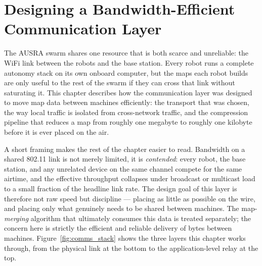 
\chapter{Designing a Bandwidth-Efficient Communication Layer}
\label{chap:communication}

The AUSRA swarm shares one resource that is both scarce and unreliable: the WiFi link between the robots and the base station. Every robot runs a complete autonomy stack on its own onboard computer, but the maps each robot builds are only useful to the rest of the swarm if they can cross that link without saturating it. This chapter describes how the communication layer was designed to move map data between machines efficiently: the transport that was chosen, the way local traffic is isolated from cross-network traffic, and the compression pipeline that reduces a map from roughly one megabyte to roughly one kilobyte before it is ever placed on the air.

A short framing makes the rest of the chapter easier to read. Bandwidth on a shared 802.11 link is not merely limited, it is \emph{contended}: every robot, the base station, and any unrelated device on the same channel compete for the same airtime, and the effective throughput collapses under broadcast or multicast load to a small fraction of the headline link rate. The design goal of this layer is therefore not raw speed but discipline --- placing as little as possible on the wire, and placing only what genuinely needs to be shared between machines. The map-\emph{merging} algorithm that ultimately consumes this data is treated separately; the concern here is strictly the efficient and reliable delivery of bytes between machines. Figure~\ref{fig:comms_stack} shows the three layers this chapter works through, from the physical link at the bottom to the application-level relay at the top.

